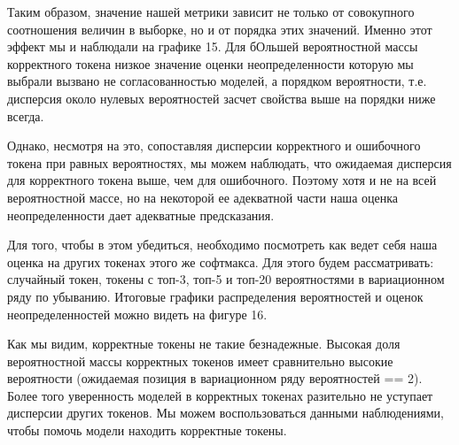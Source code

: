 \documentclass[a4paper,14pt]{extarticle}
\begin{document}
	Таким образом, значение нашей метрики зависит не только от совокупного соотношения величин в выборке, но и от порядка этих значений. Именно этот эффект мы и наблюдали на графике 15. Для бОльшей вероятностной массы корректного токена низкое значение оценки неопределенности которую мы выбрали вызвано не согласованностью моделей, а порядком вероятности, т.е. дисперсия около нулевых вероятностей засчет свойства выше на порядки ниже всегда.
	
	Однако, несмотря на это, сопоставляя дисперсии корректного и ошибочного токена при равных вероятностях, мы можем наблюдать, что ожидаемая дисперсия для корректного токена выше, чем для ошибочного. Поэтому хотя и не на всей вероятностной массе, но на некоторой ее адекватной части наша оценка неопределенности дает адекватные предсказания.
	
	Для того, чтобы в этом убедиться, необходимо посмотреть как ведет себя наша оценка на других токенах этого же софтмакса. Для этого будем рассматривать: случайный токен, токены с топ-3, топ-5 и топ-20 вероятностями в вариационном ряду по убыванию. Итоговые графики распределения вероятностей и оценок неопределенностей можно видеть на фигуре 16.
	
	\begin{figure}[t]
	\end{figure}
	
	Как мы видим, корректные токены не такие безнадежные. Высокая доля вероятностной массы корректных токенов имеет сравнительно высокие вероятности (ожидаемая позиция в вариационном ряду вероятностей == 2). Более того уверенность моделей в корректных токенах разительно не уступает дисперсии других токенов. Мы можем воспользоваться данными наблюдениями, чтобы помочь модели находить корректные токены.
	
\end{document}
